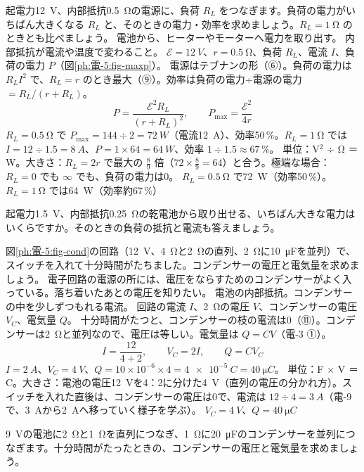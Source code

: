 \begin{phreidai}
\label{ph:電-5:ex13}起電力\qty{12}{V}、内部抵抗\qty{0.5}{\ohm}の電源に、負荷 $R_L$ をつなぎます。負荷の電力がいちばん大きくなる $R_L$ と、そのときの電力・効率を求めましょう。$R_L=\qty{1}{\ohm}$ のときとも比べましょう。
\phbamen
電池から、ヒーターやモーターへ電力を取り出す。
\phmushi
内部抵抗が電流や温度で変わること。
\phzu
$\mathcal E=\qty{12}{V}$、$r=\qty{0.5}{\ohm}$、負荷 $R_L$、電流 $I$、負荷の電力 $P$（図\ref{ph:電-5:fig-maxp}）。
\phriyu
電源はテブナンの形（⑥）。負荷の電力は $R_LI^2$ で、$R_L=r$ のとき最大（⑨）。効率は負荷の電力÷電源の電力 $=R_L/(r+R_L)$。
\phtateru
\[ P=\frac{\mathcal E^2R_L}{(r+R_L)^2},\qquad P_{\max}=\frac{\mathcal E^2}{4r} \]
\phtoku
$R_L=\qty{0.5}{\ohm}$ で $P_{\max}=144\div2=\qty{72}{W}$（電流\qty{12}{A}）、効率50\,\%。$R_L=\qty{1}{\ohm}$ では $I=12\div1.5=\qty{8}{A}$、$P=1\times64=\qty{64}{W}$、効率 $1\div1.5\approx67$\,\%。
\phtashikame
単位：V$^2$ ÷ Ω ＝ W。大きさ：$R_L=2r$ で最大の $\tfrac89$ 倍（$72\times\tfrac89=64$）と合う。極端な場合：$R_L=0$ でも $\infty$ でも、負荷の電力は0。
\kotae $R_L=\qty{0.5}{\ohm}$ で\qty{72}{W}（効率50\,\%）。$R_L=\qty{1}{\ohm}$ では\qty{64}{W}（効率約67\,\%）
\end{phreidai}
\begin{jibun}
起電力\qty{1.5}{V}、内部抵抗\qty{0.25}{\ohm}の乾電池から取り出せる、いちばん大きな電力はいくらですか。そのときの負荷の抵抗と電流も答えましょう。
\end{jibun}

\begin{phreidai}[コンデンサーをふくむ回路]
\label{ph:電-5:ex14}図\ref{ph:電-5:fig-cond}の回路（\qty{12}{V}、\qty{4}{\ohm}と\qty{2}{\ohm}の直列、\qty{2}{\ohm}に\qty{10}{\micro F}を並列）で、スイッチを入れて十分時間がたちました。コンデンサーの電圧と電気量を求めましょう。
\phbamen
電子回路の電源の所には、電圧をならすためのコンデンサーがよく入っている。落ち着いたあとの電圧を知りたい。
\phmushi
電池の内部抵抗。コンデンサーの中を少しずつもれる電流。
\phzu
回路の電流 $I$、\qty{2}{\ohm}の電圧 $V$、コンデンサーの電圧 $V_C$、電気量 $Q$。
\phriyu
十分時間がたつと、コンデンサーの枝の電流は0（⑪）。コンデンサーは\qty{2}{\ohm}と並列なので、電圧は等しい。電気量は $Q=CV$（電-3 ①）。
\phtateru
\[ I=\frac{12}{4+2},\qquad V_C=2I,\qquad Q=CV_C \]
\phtoku
$I=\qty{2}{A}$、$V_C=\qty{4}{V}$、$Q=10\times10^{-6}\times4=\qty{4e-5}{C}=\qty{40}{\micro C}$。
\phtashikame
単位：F × V ＝ C。大きさ：電池の電圧\qty{12}{V}を4：2に分けた\qty{4}{V}（直列の電圧の分かれ方）。スイッチを入れた直後は、コンデンサーの電圧は0で、電流は $12\div4=\qty{3}{A}$（電-9 で、\qty{3}{A}から\qty{2}{A}へ移っていく様子を学ぶ）。
\kotae $V_C=\qty{4}{V}$、$Q=\qty{40}{\micro C}$
\end{phreidai}
\begin{jibun}
\qty{9}{V}の電池に\qty{2}{\ohm}と\qty{1}{\ohm}を直列につなぎ、\qty{1}{\ohm}に\qty{20}{\micro F}のコンデンサーを並列につなぎます。十分時間がたったときの、コンデンサーの電圧と電気量を求めましょう。
\end{jibun}

